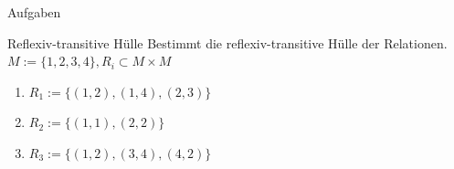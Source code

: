 \begin{frame}{Aufgaben}
  \begin{exampleblock}{Reflexiv-transitive Hülle}
    Bestimmt die reflexiv-transitive Hülle der Relationen.\\
    $M := \{1, 2, 3, 4\}, R_i \subset M \times M$
    \begin{enumerate}
      \item $R_1 := \{(1, 2), (1, 4), (2, 3)\}$
      \item $R_2 := \{(1, 1), (2, 2)\}$
      \item $R_3 := \{(1, 2), (3, 4), (4, 2)\}$
    \end{enumerate}
  \end{exampleblock}\pause
\end{frame}

